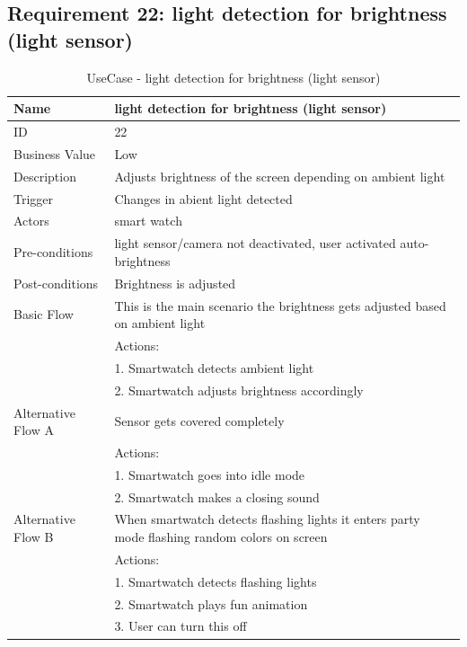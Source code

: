 \documentclass{article}
\begin{document}
	\subsection{Requirement 22: light detection for brightness (light sensor)}
		\begin{table}[htbp]
			\centering
			\captionsetup{labelformat=empty}
			\caption{UseCase - light detection for brightness (light sensor)}
			\begin{tabularx}{\textwidth}{|>{\raggedright\arraybackslash}p{}|X|}
				\hline
				Name             & light detection for brightness (light sensor)                                \\ \hline
				ID               & 22                                                                                       \\ \hline
				Business Value   & Low                                                                                    \\ \hline
				Description      & Adjusts brightness of the screen depending on ambient light \\ \hline
				Trigger          & Changes in abient light detected \\ \hline
				Actors           & smart watch                                 \\ \hline
				Pre-conditions   & light sensor/camera not deactivated, user activated auto-brightness                                    \\ \hline
				Post-conditions  & Brightness is adjusted                                                         \\ \hline
				Basic Flow       & This is the main scenario the brightness gets adjusted based on ambient light \\ \hline
								 & Actions: \\
								 & 1. Smartwatch detects ambient light \\
								 & 2. Smartwatch adjusts brightness accordingly \\ \hline
				Alternative Flow A & Sensor gets covered completely \\
								 & Actions: \\
								 & 1. Smartwatch goes into idle mode \\
								 & 2. Smartwatch makes a closing sound \\ \hline
				Alternative Flow B & When smartwatch detects flashing lights it enters party mode flashing random colors on screen \\
								 & Actions: \\
								 & 1. Smartwatch detects flashing lights \\
								 & 2. Smartwatch plays fun animation \\ 
								 & 3. User can turn this off \\ \hline
			\end{tabularx}
		\end{table}
\end{document}

